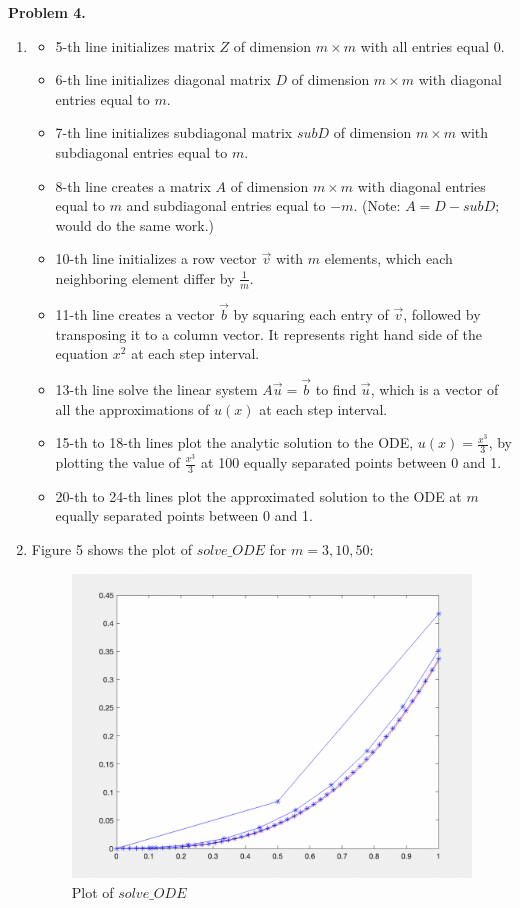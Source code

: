 \documentclass{article}
\begin{document}
\textbf{Problem 4.}
\begin{enumerate}[label=(\alph*)]
    \item 
    \begin{itemize}
        \item 5-th line initializes matrix $Z$ of dimension $m\times m$ with all entries equal 0.
        \item 6-th line initializes diagonal matrix $D$ of dimension $m\times m$ with diagonal entries equal to $m$.
        \item 7-th line initializes subdiagonal matrix $subD$ of dimension $m\times m$ with subdiagonal entries equal to $m$.
        \item 8-th line creates a matrix $A$ of dimension $m\times m$ with diagonal entries equal to $m$ and subdiagonal entries equal to $-m$. (Note: $A = D - subD;$ would do the same work.)
        \item 10-th line initializes a row vector $\vec{v}$ with $m$ elements, which each neighboring element differ by $\frac{1}{m}$.
        \item 11-th line creates a vector $\vec{b}$ by squaring each entry of $\vec{v}$, followed by transposing it to a column vector. It represents right hand side of the equation $x^2$ at each step interval.
        \item 13-th line solve the linear system $A\vec{u}=\vec{b}$ to find $\vec{u}$, which is a vector of all the approximations of $u(x)$ at each step interval.
        \item 15-th to 18-th lines plot the analytic solution to the ODE, $u(x) = \frac{x^3}{3}$, by plotting the value of $\frac{x^3}{3}$ at 100 equally separated points between 0 and 1.
        \item 20-th to 24-th lines plot the approximated solution to the ODE at $m$ equally separated points between 0 and 1.
    \end{itemize}
    
    \item 
    Figure 5 shows the plot of $solve\_ODE$ for $m=3,10,50$:
    \begin{figure}[h!]
        \centering
        \includegraphics[scale = 0.5]{solve_ODE_plot.png}
        \caption{Plot of $solve\_ODE$}
    \end{figure}
    

\end{enumerate}
\end{document}
